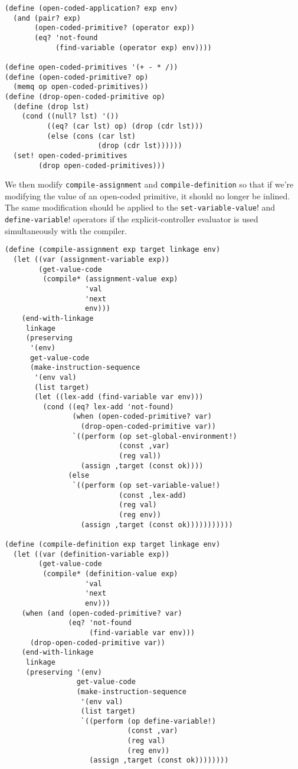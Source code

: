 \documentclass[a4paper,12pt]{article}
\begin{document}
\begin{lstlisting}
(define (open-coded-application? exp env)
  (and (pair? exp)
       (open-coded-primitive? (operator exp))
       (eq? 'not-found
            (find-variable (operator exp) env))))

(define open-coded-primitives '(+ - * /))
(define (open-coded-primitive? op)
  (memq op open-coded-primitives))
(define (drop-open-coded-primitive op)
  (define (drop lst)
    (cond ((null? lst) '())
          ((eq? (car lst) op) (drop (cdr lst)))
          (else (cons (car lst)
                      (drop (cdr lst))))))
  (set! open-coded-primitives
        (drop open-coded-primitives)))
\end{lstlisting}

We then modify \lstinline!compile-assignment! and
\lstinline!compile-definition!  so that if we're modifying the value
of an open-coded primitive, it should no longer be inlined.  The
same modification should be applied to the
\lstinline!set-variable-value!! and \lstinline!define-variable!!
operators if the explicit-controller evaluator is used simultaneously
with the compiler.

\begin{lstlisting}
(define (compile-assignment exp target linkage env)
  (let ((var (assignment-variable exp))
        (get-value-code
         (compile* (assignment-value exp)
                   'val
                   'next
                   env)))
    (end-with-linkage
     linkage
     (preserving
      '(env)
      get-value-code
      (make-instruction-sequence
       '(env val)
       (list target)
       (let ((lex-add (find-variable var env)))
         (cond ((eq? lex-add 'not-found)
                (when (open-coded-primitive? var)
                  (drop-open-coded-primitive var))
                `((perform (op set-global-environment!)
                           (const ,var)
                           (reg val))
                  (assign ,target (const ok))))
               (else
                `((perform (op set-variable-value!)
                           (const ,lex-add)
                           (reg val)
                           (reg env))
                  (assign ,target (const ok)))))))))))

(define (compile-definition exp target linkage env)
  (let ((var (definition-variable exp))
        (get-value-code
         (compile* (definition-value exp)
                   'val
                   'next
                   env)))
    (when (and (open-coded-primitive? var)
               (eq? 'not-found
                    (find-variable var env)))
      (drop-open-coded-primitive var))
    (end-with-linkage
     linkage
     (preserving '(env)
                 get-value-code
                 (make-instruction-sequence
                  '(env val)
                  (list target)
                  `((perform (op define-variable!)
                             (const ,var)
                             (reg val)
                             (reg env))
                    (assign ,target (const ok))))))))
\end{lstlisting}
\end{document}
